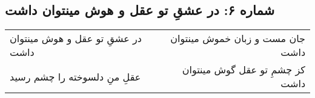 \begin{center}
\section*{شماره ۶: در عشقِ تو عقل و هوش مینتوان داشت}
\label{sec:006}
\begin{longtable}{l p{0.5cm} r}
در عشقِ تو عقل و هوش مینتوان داشت
&&
جان مست و زبان خموش مینتوان داشت
\\
عقلِ منِ دلسوخته را چشم رسید
&&
کز چشمِ تو عقل گوش مینتوان داشت
\\
\end{longtable}
\end{center}
